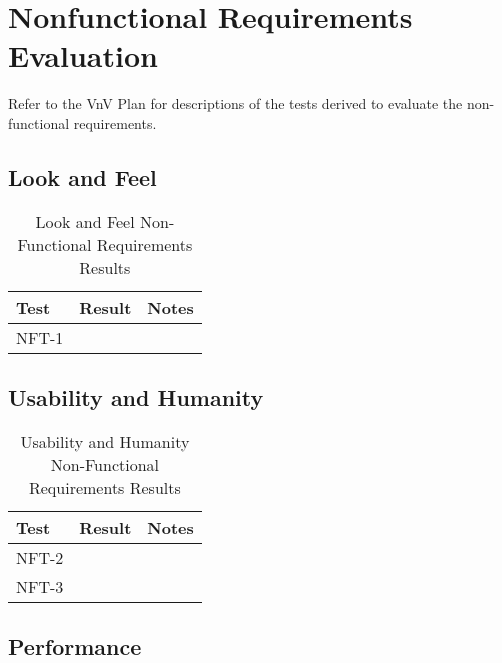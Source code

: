 \documentclass[12pt, titlepage]{article}
\begin{document}
\pagebreak

\section{Nonfunctional Requirements Evaluation}
Refer to the VnV Plan for descriptions of the tests derived to evaluate the non-functional requirements.

\subsection{Look and Feel}

\begin{table}[H]
\centering
    \setlength{\leftmargini}{0.4cm}
    \begin{tabular}{| >{\centering\arraybackslash}m{3cm} | 
      >{\centering\arraybackslash}m{4cm} | 
      >{\centering\arraybackslash}m{6cm} |}
    \hline
    \rowcolor[gray]{0.9}
    Test & Result & Notes\\
    \hline
    NFT-1 &  & \\
    \hline
    \end{tabular}
\caption{Look and Feel Non-Functional Requirements Results}
\end{table}
		
\subsection{Usability and Humanity}

\begin{table}[H]
\centering
    \setlength{\leftmargini}{0.4cm}
    \begin{tabular}{| >{\centering\arraybackslash}m{3cm} | 
      >{\centering\arraybackslash}m{4cm} | 
      >{\centering\arraybackslash}m{6cm} |}
    \hline
    \rowcolor[gray]{0.9}
    Test & Result & Notes\\
    \hline
    NFT-2 &  & \\
    \hline
    NFT-3 &  & \\
    \hline
    \end{tabular}
\caption{Usability and Humanity Non-Functional Requirements Results}
\end{table}

\subsection{Performance}
\end{document}
